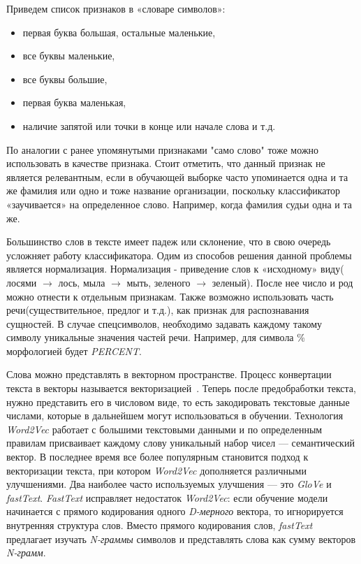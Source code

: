 \documentclass{csmathnotes}
\begin{document}
Приведем список признаков в «словаре символов»:
\begin{itemize}
    \item первая буква большая, остальные маленькие,
    \item все буквы маленькие,
    \item все буквы большие,
    \item первая буква маленькая,
    \item наличие запятой или точки в конце или начале слова и т.д.
\end{itemize}


По аналогии с ранее упомянутыми признаками "само слово" тоже можно использовать в качестве признака. Стоит отметить, что данный признак не является релевантным, если в обучающей выборке часто упоминается одна и та же фамилия или одно и тоже название организации, поскольку классификатор «заучивается» на определенное слово. Например, когда фамилия судьи одна и та же.


Большинство слов в тексте имеет падеж или склонение, что в свою очередь усложняет работу классификатора. Одим из способов решения данной проблемы является нормализация. Нормализация - приведение слов к «исходному» виду( лосями $\rightarrow$  лось, мыла $\rightarrow$ мыть, зеленого $\rightarrow$ зеленый). После нее число и род  можно отнести к отдельным признакам. Также возможно использовать часть речи(существительное, предлог и т.д.), как признак для распознавания сущностей. В случае спецсимволов, необходимо задавать каждому такому символу уникальные значения частей речи. Например, для символа \% морфологией будет \emph{PERCENT}.

 
Слова можно представлять в векторном пространстве. Процесс конвертации текста в векторы называется векторизацией~\cite{w2v}. Теперь после предобработки текста, нужно представить его в числовом виде, то есть закодировать текстовые данные числами, которые в дальнейшем могут использоваться в обучении. Технология \emph{Word2Vec} работает с большими текстовыми данными и по определенным правилам присваивает каждому слову уникальный набор чисел — семантический вектор. В последнее время все более популярным становится подход к векторизации текста, при котором \emph{Word2Vec} дополняется различными улучшениями. Два наиболее часто используемых улучшения — это \emph{GloVe} и \emph{fastText}. \emph{FastText} исправляет недостаток \emph{Word2Vec}: если обучение модели начинается с прямого кодирования одного \emph{D-мерного} вектора, то игнорируется внутренняя структура слов. Вместо прямого кодирования слов, \emph{fastText} предлагает изучать \emph{N-граммы} символов и представлять слова как сумму векторов \emph{N-грамм}.
\end{document}
